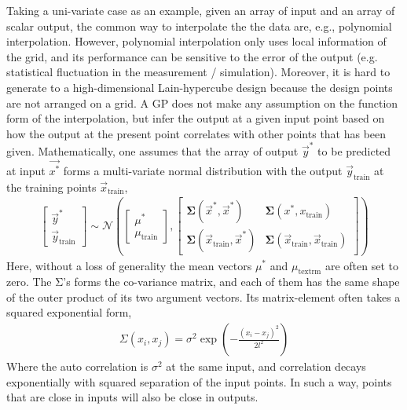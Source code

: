Taking a uni-variate case as an example, given an array of input and an array of scalar output, the common way to interpolate the the data are, e.g., polynomial interpolation.
However, polynomial interpolation only uses local information of the grid, and its performance can be sensitive to the error of the output (e.g. statistical fluctuation in the measurement / simulation).
Moreover, it is hard to generate to a high-dimensional Lain-hypercube design because the design points are not arranged on a grid.
A GP does not make any assumption on the function form of the interpolation, but infer the output at a given input point based on how the output at the present point correlates with other points that has been given.
Mathematically, one assumes that the array of output $\vec{y}^*$ to be predicted at input $\vec{x^*}$ forms a multi-variate normal distribution with the output $\vec{y}_{\textrm{train}}$ at the training points $\vec{x}_{\textrm{train}}$,
\begin{eqnarray}
\begin{bmatrix}
\vec{y}^* \\
\vec{y}_{\textrm{train}}
\end{bmatrix}
\sim
\mathcal{N}\left(
\begin{bmatrix}
\mu^* \\
\mu_{\textrm{train}}
\end{bmatrix},
\begin{bmatrix}
\mathbf{\Sigma}(\vec{x}^*, \vec{x}^*)& \mathbf{\Sigma}(x^*, x_{\textrm{train}}) \\
\mathbf{\Sigma}(\vec{x}_{\textrm{train}}, \vec{x}^*)& \mathbf{\Sigma}(\vec{x}_{\textrm{train}}, \vec{x}_{\textrm{train}})
\end{bmatrix}
\right)
\end{eqnarray}
Here, without a loss of generality the mean vectors $\mu^*$ and $\mu_{\textrm{textrm}}$ are often set to zero.
The $\mathrm{\Sigma}$'s forms the co-variance matrix, and each of them has the same shape of the outer product of its two argument vectors.
Its matrix-element often takes a squared exponential form,
\begin{eqnarray}
\Sigma(x_i, x_j) = \sigma^2 \exp\left(-\frac{(x_i-x_j)^2}{2l^2}\right) 
\end{eqnarray}
Where the auto correlation is $\sigma^2$ at the same input, and correlation decays exponentially with squared separation of the input points.
In such a way, points that are close in inputs will also be close in outputs.

